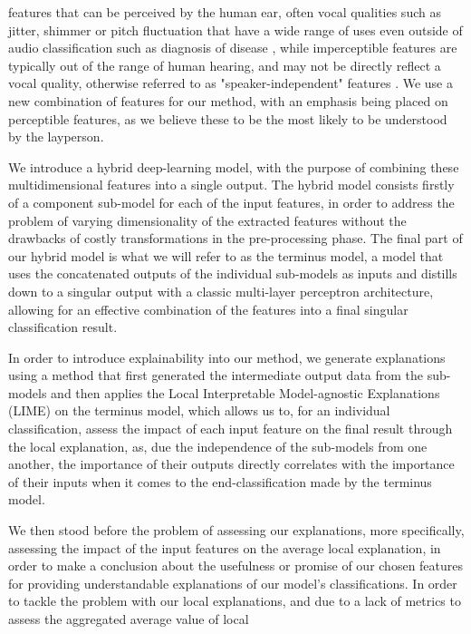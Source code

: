 \documentclass{article}
\begin{document}
	features that can be perceived by the human ear, often vocal qualities such as jitter, shimmer
	or pitch fluctuation that have a wide range of uses even outside of audio classification such
	as diagnosis of disease \cite{chaiwongyen_deepfake-speech_2023}, while imperceptible features
	are typically out of the range of human hearing, and may not be directly reflect a vocal
	quality, otherwise referred to as "speaker-independent" features \cite{liu_hidden--wave_2023}.
	We use a new combination of features for our method, with an emphasis being placed on
	perceptible features, as we believe these to be the most likely to be understood by the
	layperson.
	\par
	We introduce a hybrid deep-learning model, with the purpose of combining these
	multidimensional features into a single output. The hybrid model consists firstly of a
	component sub-model for each of the input features, in order to address the problem of varying
	dimensionality of the extracted features without the drawbacks of costly transformations in
	the pre-processing phase. The final part of our hybrid model is what we will refer to as the
	terminus model, a model that uses the concatenated outputs of the individual sub-models as
	inputs and distills down to a singular output with a classic multi-layer perceptron
	architecture, allowing for an effective combination of the features into a final singular
	classification result.
	\par
	In order to introduce explainability into our method, we generate explanations using a method
	that first generated the intermediate output data from the sub-models and then applies the
	Local Interpretable Model-agnostic Explanations (LIME) \cite{ribeiro_why_2016} on the terminus
	model, which allows us to, for an individual classification, assess the impact of each input
	feature on the final result through the local explanation, as, due the independence of the
	sub-models from one another, the importance of their outputs directly correlates with the
	importance of their inputs when it comes to the end-classification made by the terminus model.
	\par
	We then stood before the problem of assessing our explanations, more specifically, assessing
	the impact of the input features on the average local explanation, in order to make a
	conclusion about the usefulness or promise of our chosen features for providing understandable
	explanations of our model's classifications. In order to tackle the problem with our local
	explanations, and due to a lack of metrics to assess the aggregated average value of local
\end{document}

